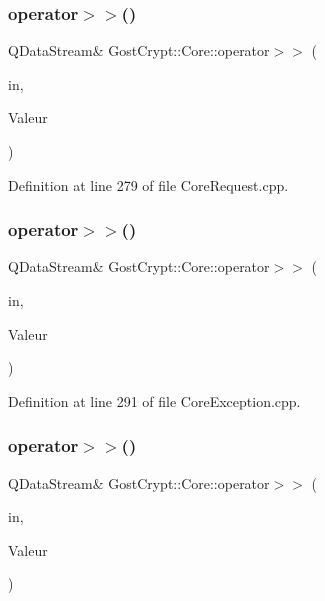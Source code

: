 \subsubsection{\texorpdfstring{operator$>$$>$()}{operator>>()}\hspace{0.1cm}{\footnotesize\ttfamily [52/56]}}
{\footnotesize\ttfamily Q\+Data\+Stream\& Gost\+Crypt\+::\+Core\+::operator$>$$>$ (\begin{DoxyParamCaption}\item[{Q\+Data\+Stream \&}]{in,  }\item[{\hyperlink{struct_gost_crypt_1_1_core_1_1_backup_header_request}{Backup\+Header\+Request} \&}]{Valeur }\end{DoxyParamCaption})}



Definition at line 279 of file Core\+Request.\+cpp.

\mbox{\label{namespace_gost_crypt_1_1_core_a17bf25856ad6aaec42e7c4b5a68f773a}} 
\subsubsection{\texorpdfstring{operator$>$$>$()}{operator>>()}\hspace{0.1cm}{\footnotesize\ttfamily [53/56]}}
{\footnotesize\ttfamily Q\+Data\+Stream\& Gost\+Crypt\+::\+Core\+::operator$>$$>$ (\begin{DoxyParamCaption}\item[{Q\+Data\+Stream \&}]{in,  }\item[{\hyperlink{class_gost_crypt_1_1_core_1_1_random_number_generator_not_running}{Gost\+Crypt\+::\+Core\+::\+Random\+Number\+Generator\+Not\+Running} \&}]{Valeur }\end{DoxyParamCaption})}



Definition at line 291 of file Core\+Exception.\+cpp.

\mbox{\label{namespace_gost_crypt_1_1_core_a94776731b2ffff13db8244acb780519c}} 
\subsubsection{\texorpdfstring{operator$>$$>$()}{operator>>()}\hspace{0.1cm}{\footnotesize\ttfamily [54/56]}}
{\footnotesize\ttfamily Q\+Data\+Stream\& Gost\+Crypt\+::\+Core\+::operator$>$$>$ (\begin{DoxyParamCaption}\item[{Q\+Data\+Stream \&}]{in,  }\item[{\hyperlink{struct_gost_crypt_1_1_core_1_1_restore_header_request}{Restore\+Header\+Request} \&}]{Valeur }\end{DoxyParamCaption})}




